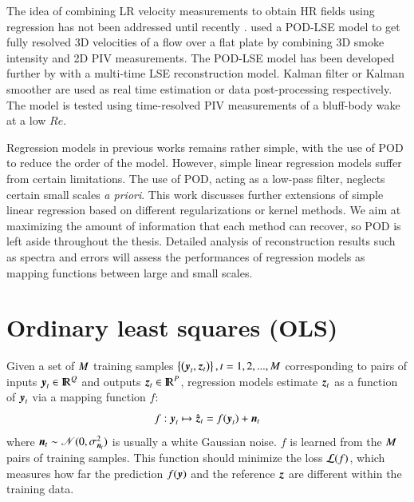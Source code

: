 The idea of combining LR velocity measurements to obtain HR fields using regression has not been addressed until recently \citep{melnick2012experimental,tu2013integration}. \citet{melnick2012experimental} used a POD-LSE model to get fully resolved 3D velocities of a flow over a flat plate by combining 3D smoke intensity and 2D PIV measurements. The POD-LSE model has been developed further by \citet{tu2013integration} with a multi-time LSE reconstruction model. Kalman filter or Kalman smoother are used as real time estimation or data post-processing respectively. The model is tested using time-resolved PIV measurements of a bluff-body wake at a low $ Re $.

Regression models in previous works remains rather simple, with the use of POD to reduce the order of the model. However, simple linear regression models suffer from certain limitations. The use of POD, acting as a low-pass filter, neglects certain small scales \textit{a priori}. This work discusses further extensions of simple linear regression based on different regularizations or kernel methods. We aim at maximizing the amount of information that each method can recover, so POD is left aside throughout the thesis. Detailed analysis of reconstruction results such as spectra and errors will assess the performances of regression models as mapping functions between large and small scales. 

\section{Ordinary least squares (OLS)}
Given a set of $ M $ training samples $ \left\lbrace \left(\operatorname{\boldsymbol{y}}_t, \operatorname{\boldsymbol{z}}_t\right)\right\rbrace, t= 1,2,...,M $ corresponding to pairs of inputs $ \operatorname{\boldsymbol{y}}_t \in {\rm I\!R}^{Q}$ and outputs $ \operatorname{\boldsymbol{z}}_t \in {\rm I\!R}^{P}$, regression models estimate $ \operatorname{\boldsymbol{z}}_t $ as a function of $\operatorname{\boldsymbol{y}}_t $ via a mapping function $ f $: 
\begin{equation}
	f:  \operatorname{\boldsymbol{y}}_t \mapsto  \operatorname{\hat{\operatorname{\boldsymbol{z}} }}_t = f(\operatorname{\boldsymbol{y}}_t) + \operatorname{\boldsymbol{n}}_t
\end{equation}
where $ \operatorname{\boldsymbol{n}}_t \sim \mathscr{N}(0,\sigma^2_{\operatorname{\boldsymbol{n}}_t})$ is usually a white Gaussian noise. $ f $ is learned from the $ M $ pairs of training samples. This function should minimize the loss $ \mathcal{L}(f) $, which measures how far the prediction $ f(\operatorname{\boldsymbol{y}}) $ and the reference $ \operatorname{\boldsymbol{z}} $ are different within the training data.

